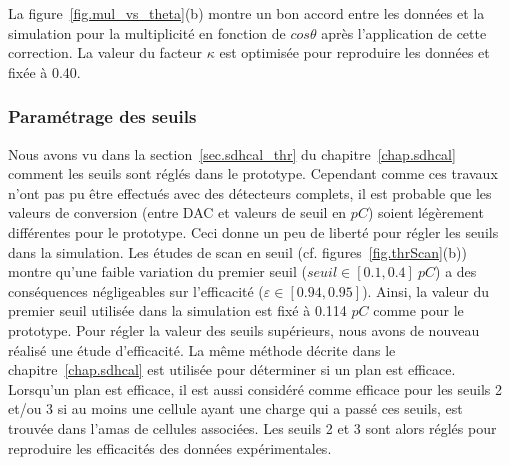 La figure~\ref{fig.mul_vs_theta}(b) montre un bon accord entre les données et la simulation pour la multiplicité en fonction de $cos\theta$ après l'application de cette correction. La valeur du facteur $\kappa$ est optimisée pour reproduire les données et fixée à 0.40.


\subsubsection{Paramétrage des seuils}
Nous avons vu dans la section~\ref{sec.sdhcal_thr} du chapitre~\ref{chap.sdhcal} comment les seuils sont réglés dans le prototype. Cependant comme ces travaux n'ont pas pu être effectués avec des détecteurs complets, il est probable que les valeurs de conversion (entre DAC et valeurs de seuil en $pC$) soient légèrement différentes pour le prototype. Ceci donne un peu de liberté pour régler les seuils dans la simulation. Les études de scan en seuil (cf. figures~\ref{fig.thrScan}(b)) montre qu'une faible variation du premier seuil ($seuil\in[0.1,0.4]~pC$) a des conséquences négligeables sur l'efficacité ($\varepsilon\in[0.94,0.95]$). Ainsi, la valeur du premier seuil utilisée dans la simulation est fixé à 0.114 $pC$ comme pour le prototype. Pour régler la valeur des seuils supérieurs, nous avons de nouveau réalisé une étude d'efficacité. La même méthode décrite dans le chapitre~\ref{chap.sdhcal} est utilisée pour déterminer si un plan est efficace. Lorsqu'un plan est efficace, il est aussi considéré comme efficace pour les seuils 2 et/ou 3 si au moins une cellule ayant une charge qui a passé ces seuils, est trouvée dans l'amas de cellules associées. Les seuils 2 et 3 sont alors réglés pour reproduire les efficacités des données expérimentales. 
